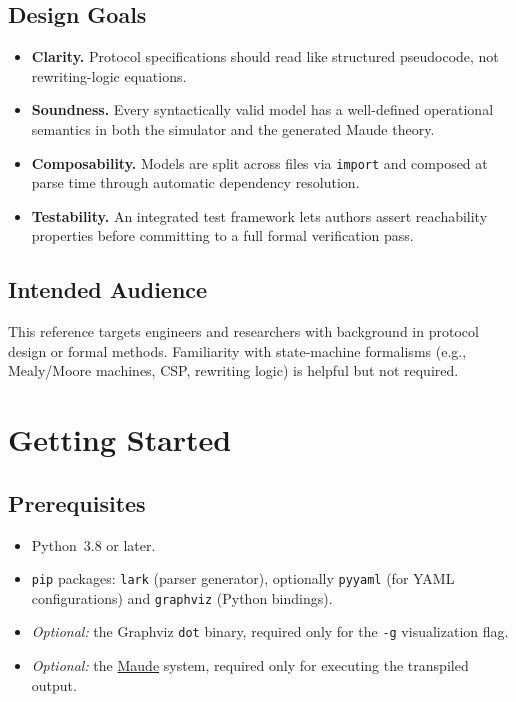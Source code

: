 \documentclass[11pt,letterpaper]{article}
\begin{document}
\subsection{Design Goals}
\begin{itemize}[leftmargin=1.5em]
  \item \textbf{Clarity.}  Protocol specifications should read like
        structured pseudocode, not rewriting-logic equations.
  \item \textbf{Soundness.}  Every syntactically valid model has a
        well-defined operational semantics in both the simulator and the
        generated Maude theory.
  \item \textbf{Composability.}  Models are split across files via
        \lstinline{import} and composed at parse time through automatic
        dependency resolution.
  \item \textbf{Testability.}  An integrated test framework lets authors
        assert reachability properties before committing to a full formal
        verification pass.
\end{itemize}

\subsection{Intended Audience}

This reference targets engineers and researchers with background in
protocol design or formal methods.  Familiarity with state-machine
formalisms (e.g., Mealy/Moore machines, CSP, rewriting logic) is
helpful but not required.


\section{Getting Started}
\label{sec:getting-started}

\subsection{Prerequisites}
\begin{itemize}[leftmargin=1.5em]
  \item Python~3.8 or later.
  \item \texttt{pip} packages: \texttt{lark} (parser generator), optionally
        \texttt{pyyaml} (for YAML configurations) and \texttt{graphviz}
        (Python bindings).
  \item \emph{Optional:} the Graphviz \texttt{dot} binary, required only for
        the \texttt{-g} visualization flag.
  \item \emph{Optional:} the
        \href{http://maude.cs.illinois.edu}{Maude} system, required only for
        executing the transpiled output.
\end{itemize}
\end{document}
